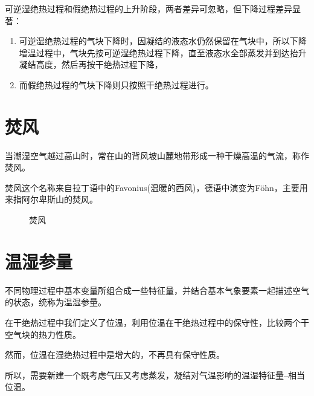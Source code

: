 \documentclass[UTF8,a4paper,11pt,oneside]{ctexbook}
\begin{document}
可逆湿绝热过程和假绝热过程的上升阶段，两者差异可忽略，但下降过程差异显著：
\begin{enumerate}
    \item 可逆湿绝热过程的气块下降时，因凝结的液态水仍然保留在气块中，所以下降增温过程中，气块先按可逆湿绝热过程下降，直至液态水全部蒸发并到达抬升凝结高度，然后再按干绝热过程下降，
    \item 而假绝热过程的气块下降则只按照干绝热过程进行。
\end{enumerate}

\section{焚风}

当潮湿空气越过高山时，常在山的背风坡山麓地带形成一种干燥高温的气流，称作焚风。

焚风这个名称来自拉丁语中的Favonius(温暖的西风)，德语中演变为F\"ohn，主要用来指阿尔卑斯山的焚风。
\begin{figure}[htbp]
    \centering
    \caption{焚风}
\end{figure}

\section{温湿参量}

不同物理过程中基本变量所组合成一些特征量，并结合基本气象要素一起描述空气的状态，统称为温湿参量。

在干绝热过程中我们定义了位温，利用位温在干绝热过程中的保守性，比较两个干空气块的热力性质。

然而，位温在湿绝热过程中是增大的，不再具有保守性质。

所以，需要新建一个既考虑气压又考虑蒸发，凝结对气温影响的温湿特征量--相当位温。
\end{document}
